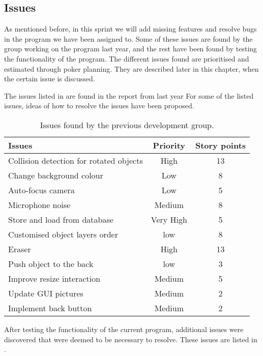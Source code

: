 \subsection{Issues}
As mentioned before, in this sprint we will add missing features and resolve bugs in the program we have been assigned to.
Some of these issues are found by the group working on the program last year, and the rest have been found by testing the functionality of the program.
The different issues found are prioritised and estimated through poker planning.
They are described later in this chapter, when the certain issue is discussed.

The issues listed in  are found in the report from last year \citep{misc:crocold}
For some of the listed issues, ideas of how to resolve the issues have been proposed.

\begin{table}[h]
\begin{tabular}{|p{5cm}|c|c|}
\hline 
Issues & Priority & Story points \\ 
\hline 
Collision detection for rotated objects & High & 13 \\ 
\hline 
Change background colour & Low & 8 \\ 
\hline 
Auto-focus camera & Low & 5 \\ 
\hline 
Microphone noise & Medium & 8 \\ 
\hline 
Store and load from database & Very High & 5 \\ 
\hline 
Customised object layers order & low & 8 \\ 
\hline 
Eraser & High & 13 \\ 
\hline 
Push object to the back & low & 3 \\ 
\hline 
Improve resize interaction & Medium & 5\\ 
\hline 
Update GUI pictures & Medium & 2 \\ 
\hline 
Implement back button & Medium & 2 \\ 
\hline 
\end{tabular}
\caption{Issues found by the previous development group.}
\label{table:oldissues}
\end{table}

After testing the functionality of the current program, additional issues were discovered that were deemed to be necessary to resolve.
These issues are listed in .

